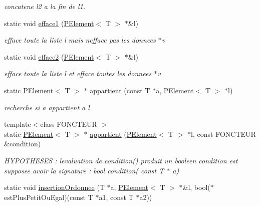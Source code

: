 \begin{DoxyCompactItemize}
\begin{DoxyCompactList}\small\item\em concatene l2 a la fin de l1. \end{DoxyCompactList}\item 
static void \mbox{\hyperlink{class_p_element_abd2e6b05692413616650fcd953317324}{efface1}} (\mbox{\hyperlink{class_p_element}{P\+Element}}$<$ T $>$ $\ast$\&l)
\begin{DoxyCompactList}\small\item\em efface toute la liste l mais n\textquotesingle{}efface pas les donnees $\ast$v \end{DoxyCompactList}\item 
static void \mbox{\hyperlink{class_p_element_a9e377727c7c78db9f49a7dde2ead74cd}{efface2}} (\mbox{\hyperlink{class_p_element}{P\+Element}}$<$ T $>$ $\ast$\&l)
\begin{DoxyCompactList}\small\item\em efface toute la liste l et efface toutes les donnees $\ast$v \end{DoxyCompactList}\item 
static \mbox{\hyperlink{class_p_element}{P\+Element}}$<$ T $>$ $\ast$ \mbox{\hyperlink{class_p_element_aee7ccc9dcc49558af92960dd60fafc9d}{appartient}} (const T $\ast$a, \mbox{\hyperlink{class_p_element}{P\+Element}}$<$ T $>$ $\ast$l)
\begin{DoxyCompactList}\small\item\em recherche si a appartient a l \end{DoxyCompactList}\item 
{\footnotesize template$<$class F\+O\+N\+C\+T\+E\+UR $>$ }\\static \mbox{\hyperlink{class_p_element}{P\+Element}}$<$ T $>$ $\ast$ \mbox{\hyperlink{class_p_element_ad1ad40db30605db39a57c08058cf444c}{appartient}} (\mbox{\hyperlink{class_p_element}{P\+Element}}$<$ T $>$ $\ast$l, const F\+O\+N\+C\+T\+E\+UR \&condition)
\begin{DoxyCompactList}\small\item\em H\+Y\+P\+O\+T\+H\+E\+S\+ES \+: l\textquotesingle{}evaluation de condition() produit un booleen condition est supposee avoir la signature \+: bool condition( const T $\ast$ a) \end{DoxyCompactList}\item 
static void \mbox{\hyperlink{class_p_element_a0e32256cbecaea72487f347763b38d57}{insertion\+Ordonnee}} (T $\ast$a, \mbox{\hyperlink{class_p_element}{P\+Element}}$<$ T $>$ $\ast$\&l, bool($\ast$est\+Plus\+Petit\+Ou\+Egal)(const T $\ast$a1, const T $\ast$a2))

\end{DoxyCompactItemize}
